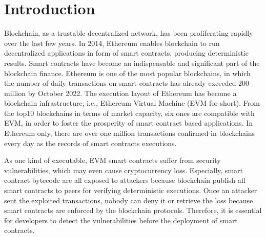 \section{Introduction}
Blockchain, as a trustable decentralized network, has been proliferating rapidly over the last few years. 
In 2014, Ethereum\cite{wood2014ethereum} enables blockchain to run decentralized applications in form of smart contracts, producing deterministic results. %
Smart contracts have become an indispensable and significant part of the blockchain finance.
%
Ethereum is one of the most popular blockchains, in which the number of daily transactions on smart contracts has already exceeded 200 million by October 2022\cite{etherscan}.  
The execution layout of Ethereum has become a blockchain infrastructure, i.e., Ethereum Virtual Machine (EVM for short).
From the top10 blockchains in terms of market capacity, six ones are compatible with EVM, in order to foster the prosperity of smart contract based applications\cite{coinmarketcap}.  
In Ethereum only, there are over one million transactions confirmed in blockchains every day as the records of smart contracts executions\cite{etherscan}.  

As one kind of executable, EVM smart contracts suffer from security vulnerabilities, which may even cause cryptocurrency loss\cite{ethtract,smartcontractsurvey,defects}. 
Especially, smart contract bytecode are all exposed to attackers because blockchain publish all smart contracts to peers for verifying deterministic executions.
Once an attacker sent the exploited transactions, nobody can deny it or retrieve the loss because smart contracts are enforced by the blockchain protocols. Therefore, it is essential for developers to detect the vulnerabilities before the deployment of smart contracts.

